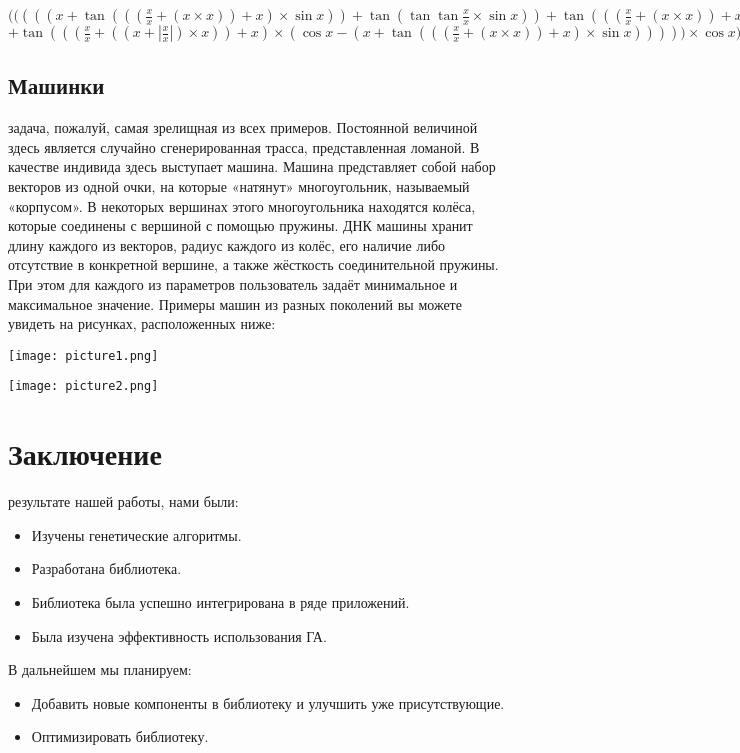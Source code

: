 \documentclass[a4paper, oneside, 11pt]{article}
\newcommand\abs[1]{\left|#1\right|}
\begin{document}
\begin{center}
$({({({({({x} + {\tan { ({({({\frac{x}{x}} + {({x} \times {x})})} + {x})} \times {\sin { x }}) }})} + {\tan { ({\tan { \tan { \frac{x}{x} } }} \times {\sin { x }}) }})} + {\tan { ({({({\frac{x}{x}} + {({x} \times {x})})} + {x})} \times {x}) }})}}$ ${+ {\tan { ({({({\frac{x}{x}} + {({({x} + {\abs { \frac{x}{x} }})} \times {x})})} + {x})} \times {({\cos { x }} - {({x} + {\tan { ({({({\frac{x}{x}} + {({x} \times {x})})} + {x})} \times {\sin { x }}) }})})}) }})} \times {\cos { x }})$
\end{center}

\subsection{Машинки}
\indent{} задача, пожалуй, самая зрелищная из всех примеров. Постоянной величиной здесь является случайно сгенерированная трасса, представленная ломаной. В качестве индивида здесь выступает машина. Машина представляет собой набор векторов из одной очки, на которые «натянут» многоугольник, называемый «корпусом».  В некоторых вершинах этого многоугольника находятся колёса, которые соединены с вершиной с помощью пружины. ДНК машины хранит длину каждого из векторов, радиус каждого из колёс, его наличие либо отсутствие в конкретной вершине, а также жёсткость соединительной пружины. При этом для каждого из параметров пользователь задаёт минимальное и максимальное значение. Примеры машин из разных поколений вы можете увидеть на рисунках, расположенных ниже:

\begin{center}
\texttt{[image: picture1.png]}
\end{center}

\begin{center}
\texttt{[image: picture2.png]}
\end{center}
\newpage
\section{Заключение}
 результате нашей работы, нами были:
\begin{itemize}
\item Изучены генетические алгоритмы.
\item Разработана библиотека.
\item Библиотека была успешно интегрирована в ряде приложений.
\item Была изучена эффективность использования ГА.
\end{itemize}
В дальнейшем мы планируем:
\begin{itemize}
\item Добавить новые компоненты в библиотеку и улучшить уже присутствующие.
\item Оптимизировать библиотеку.
\end{itemize}
\end{document}
